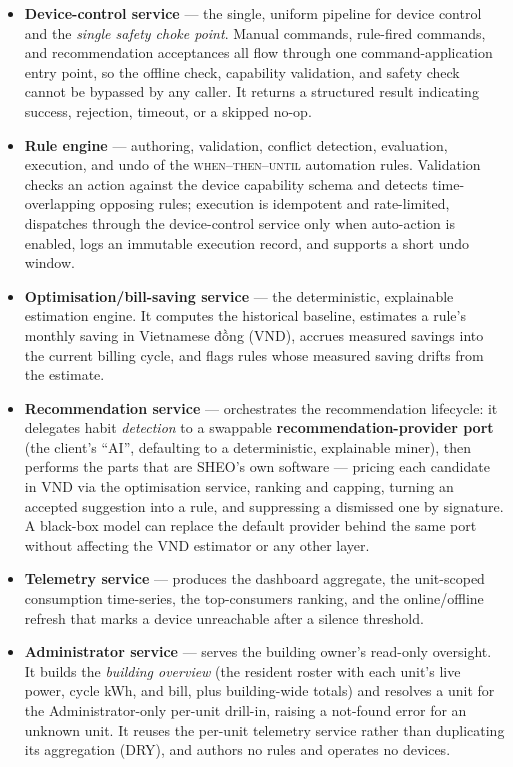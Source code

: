 \begin{itemize}[leftmargin=1.4em]
  \item \textbf{Device-control service} --- the single, uniform pipeline for device
  control and the \emph{single safety choke point}. Manual commands, rule-fired
  commands, and recommendation acceptances all flow through one command-application
  entry point, so the offline check, capability validation, and safety check cannot be
  bypassed by any caller. It returns a structured result indicating success, rejection,
  timeout, or a skipped no-op.
  \item \textbf{Rule engine} --- authoring, validation, conflict detection, evaluation,
  execution, and undo of the \textsc{when}--\textsc{then}--\textsc{until} automation
  rules. Validation checks an action against the device capability schema and detects
  time-overlapping opposing rules; execution is idempotent and rate-limited, dispatches
  through the device-control service only when auto-action is enabled, logs an immutable
  execution record, and supports a short undo window.
  \item \textbf{Optimisation/bill-saving service} --- the deterministic, explainable
  estimation engine. It computes the historical baseline, estimates a rule's monthly
  saving in Vietnamese đồng (VND), accrues measured savings into the current billing
  cycle, and flags rules whose measured saving drifts from the estimate.
  \item \textbf{Recommendation service} --- orchestrates the recommendation lifecycle:
  it delegates habit \emph{detection} to a swappable \textbf{recommendation-provider port}
  (the client's ``AI'', defaulting to a deterministic, explainable miner), then performs
  the parts that are SHEO's own software --- pricing each candidate in VND via the
  optimisation service, ranking and capping, turning an accepted suggestion into a rule,
  and suppressing a dismissed one by signature. A black-box model can replace the default
  provider behind the same port without affecting the VND estimator or any other layer.
  \item \textbf{Telemetry service} --- produces the dashboard aggregate, the
  unit-scoped consumption time-series, the top-consumers ranking, and the
  online/offline refresh that marks a device unreachable after a silence threshold.
  \item \textbf{Administrator service} --- serves the building owner's read-only oversight.
  It builds the \emph{building overview} (the resident roster with each unit's live power,
  cycle kWh, and bill, plus building-wide totals) and resolves a unit for the
  Administrator-only per-unit drill-in, raising a not-found error for an unknown unit. It
  reuses the per-unit telemetry service rather than duplicating its aggregation (DRY), and
  authors no rules and operates no devices.
\end{itemize}

